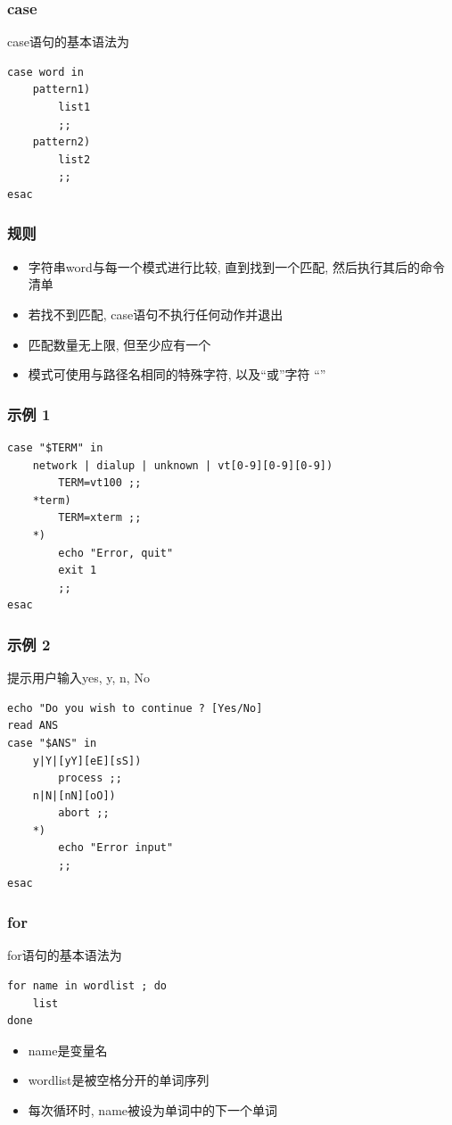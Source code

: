 \documentclass[compress]{beamer}
\begin{document}
\begin{frame}[fragile]
\frametitle{case}

case语句的基本语法为
\begin{Verbatim}
case word in
    pattern1)
        list1
        ;;
    pattern2)
        list2
        ;;
esac
\end{Verbatim}
\end{frame}

\begin{frame}
  \frametitle{规则}
\begin{itemize}
\item 字符串word与每一个模式进行比较, 直到找到一个匹配, 然后执行其后的命令清单
\item 若找不到匹配, case语句不执行任何动作并退出
\item 匹配数量无上限, 但至少应有一个
\item 模式可使用与路径名相同的特殊字符, 以及``或''字符 ``\textbar''
\end{itemize}
\end{frame}

\begin{frame}[fragile]
\frametitle{示例 1}

\begin{lstlisting}
case "$TERM" in
    network | dialup | unknown | vt[0-9][0-9][0-9])
        TERM=vt100 ;;
    *term)
        TERM=xterm ;;
    *)
        echo "Error, quit"
        exit 1
        ;;
esac
\end{lstlisting}
\end{frame}

\begin{frame}[fragile]
\frametitle{示例 2}

提示用户输入yes, y, n, No \\
\begin{lstlisting}
echo "Do you wish to continue ? [Yes/No]
read ANS
case "$ANS" in
    y|Y|[yY][eE][sS])
        process ;;
    n|N|[nN][oO])
        abort ;;
    *)
        echo "Error input"
        ;;
esac
\end{lstlisting}
\end{frame}

\begin{frame}[fragile]
\frametitle{for}

for语句的基本语法为\\
\begin{Verbatim}
for name in wordlist ; do
    list
done
\end{Verbatim}

\begin{itemize}
\item name是变量名
\item wordlist是被空格分开的单词序列
\item 每次循环时, name被设为单词中的下一个单词
\end{itemize}
\end{frame}
\end{document}
